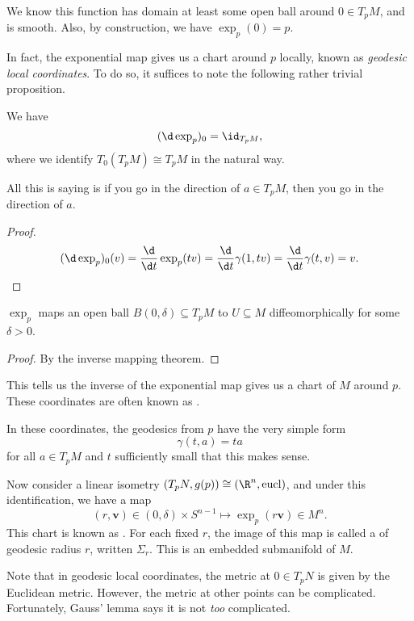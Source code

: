\documentclass[a4paper]{article}
\begin{document}
We know this function has domain at least some open ball around $0 \in T_p M$, and is smooth. Also, by construction, we have $\exp_p(0) = p$.

In fact, the exponential map gives us a chart around $p$ locally, known as \emph{geodesic local coordinates}. To do so, it suffices to note the following rather trivial proposition.

\begin{prop}
  We have
  \[
    (\d \exp_p)_0 = \id _{T_p M},
  \]
  where we identify $T_0 (T_p M) \cong T_p M$ in the natural way.
\end{prop}
All this is saying is if you go in the direction of $a \in T_p M$, then you go in the direction of $a$.

\begin{proof}
   \[
     (\d \exp_p)_0(v) = \frac{\d}{\d t} \exp_p(tv) = \frac{\d}{\d t} \gamma(1, tv) = \frac{\d}{\d t} \gamma(t, v) = v.
   \]
\end{proof}

\begin{cor}
  $\exp_p$ maps an open ball $B(0, \delta) \subseteq T_p M$ to $U \subseteq M$ diffeomorphically for some $\delta > 0$.
\end{cor}

\begin{proof}
  By the inverse mapping theorem.
\end{proof}

This tells us the inverse of the exponential map gives us a chart of $M$ around $p$. These coordinates are often known as .

In these coordinates, the geodesics from $p$ have the very simple form
\[
  \gamma(t, a) = ta
\]
for all $a \in T_p M$ and $t$ sufficiently small that this makes sense.

Now consider a linear isometry $(T_p N, g(p)) \cong (\R^n, \mathrm{eucl})$, and under this identification, we have a map
\[
  (r, \mathbf{v}) \in (0, \delta) \times S^{n - 1} \mapsto \exp_p (r\mathbf{v}) \in M^n.
\]
This chart is known as . For each fixed $r$, the image of this map is called a  of geodesic radius $r$, written $\Sigma_r$. This is an embedded submanifold of $M$.

Note that in geodesic local coordinates, the metric at $0 \in T_p N$ is given by the Euclidean metric. However, the metric at other points can be complicated. Fortunately, Gauss' lemma says it is not \emph{too} complicated.
\end{document}
